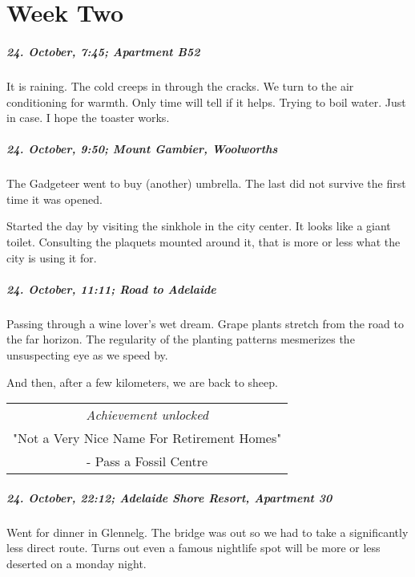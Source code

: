 \chapter{Week Two}


\paragraph{24. October, 7:45; Apartment B52}
It is raining.
The cold creeps in through the cracks.
We turn to the air conditioning for warmth.
Only time will tell if it helps.
Trying to boil water.
Just in case.
I hope the toaster works.

\paragraph{24. October, 9:50; Mount Gambier, Woolworths}
The Gadgeteer went to buy (another) umbrella.
The last did not survive the first time it was opened.

Started the day by visiting the sinkhole in the city center.
It looks like a giant toilet.
Consulting the plaquets mounted around it, that is more or less what the city is using it for.

\paragraph{24. October, 11:11; Road to Adelaide}
Passing through a wine lover's wet dream.
Grape plants stretch from the road to the far horizon.
The regularity of the planting patterns mesmerizes the unsuspecting eye as we speed by.

And then, after a few kilometers, we are back to sheep.

\begin{center}
\begin{tabular}{||c||}
\emph{Achievement unlocked}\\
"Not a Very Nice Name For Retirement Homes"\\
\multicolumn{1}{||p{0.8\textwidth}||}{\footnotesize - Pass a Fossil Centre} \\
\end{tabular}
\end{center}

\paragraph{24. October, 22:12; Adelaide Shore Resort, Apartment 30}
Went for dinner in Glennelg.
The bridge was out so we had to take a significantly less direct route.
Turns out even a famous nightlife spot will be more or less deserted on a monday night.

